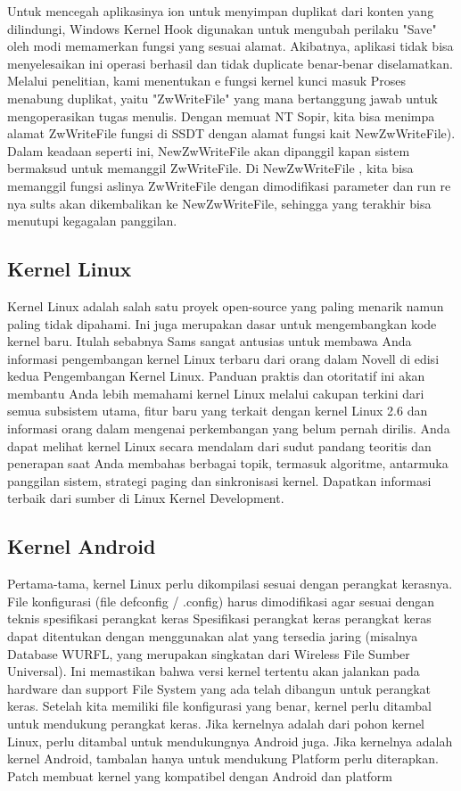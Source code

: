  Untuk mencegah aplikasinya
 ion untuk menyimpan duplikat dari
 konten yang dilindungi, Windows Kernel Hook digunakan untuk mengubah
 perilaku "Save" oleh modi
 memamerkan fungsi yang sesuai
 alamat. Akibatnya, aplikasi tidak bisa menyelesaikan ini
 operasi berhasil dan tidak duplicate benar-benar diselamatkan.
 Melalui penelitian, kami menentukan
 e fungsi kernel kunci masuk	
 Proses menabung duplikat, yaitu "ZwWriteFile" yang mana bertanggung jawab untuk mengoperasikan tugas menulis. Dengan memuat NT Sopir, kita bisa menimpa alamat ZwWriteFile fungsi di SSDT dengan alamat fungsi kait
 NewZwWriteFile). Dalam keadaan seperti ini, NewZwWriteFile akan dipanggil kapan sistem bermaksud untuk memanggil ZwWriteFile. Di NewZwWriteFile , kita bisa memanggil fungsi aslinya ZwWriteFile
 dengan dimodifikasi parameter dan run re nya sults akan dikembalikan ke NewZwWriteFile, sehingga yang terakhir bisa menutupi kegagalan panggilan.
	
\subsection{Kernel Linux}
 Kernel Linux adalah salah satu proyek open-source yang paling menarik namun paling tidak dipahami. Ini juga merupakan dasar untuk mengembangkan kode kernel baru. 
 Itulah sebabnya Sams sangat antusias untuk membawa Anda informasi pengembangan kernel Linux terbaru dari orang dalam Novell di edisi kedua Pengembangan Kernel Linux. 
 Panduan praktis dan otoritatif ini akan membantu Anda lebih memahami kernel Linux melalui cakupan terkini dari semua subsistem utama, fitur baru yang terkait dengan kernel Linux 2.6 dan informasi orang dalam mengenai perkembangan yang belum pernah dirilis. 
 Anda dapat melihat kernel Linux secara mendalam dari sudut pandang teoritis dan penerapan saat Anda membahas berbagai topik, termasuk algoritme, antarmuka panggilan sistem, strategi paging dan sinkronisasi kernel. 
 Dapatkan informasi terbaik dari sumber di Linux Kernel Development.
	
\subsection{Kernel Android}
 Pertama-tama, kernel Linux perlu dikompilasi
 sesuai dengan perangkat kerasnya. File konfigurasi
 (file defconfig / .config) harus dimodifikasi agar sesuai dengan teknis
 spesifikasi perangkat keras Spesifikasi perangkat keras
 perangkat keras dapat ditentukan dengan menggunakan alat yang tersedia
 jaring (misalnya Database WURFL, yang merupakan singkatan dari Wireless
 File Sumber Universal).
 Ini memastikan bahwa versi kernel tertentu akan
 jalankan pada hardware dan support File System yang ada
 telah dibangun untuk perangkat keras.
 Setelah kita memiliki file konfigurasi yang benar, kernel perlu 
 ditambal untuk mendukung perangkat keras. Jika kernelnya adalah
 dari pohon kernel Linux, perlu ditambal untuk mendukungnya
 Android juga. Jika kernelnya adalah kernel Android, tambalan hanya untuk
 mendukung Platform perlu diterapkan.
 Patch membuat kernel yang kompatibel dengan Android dan
 platform
